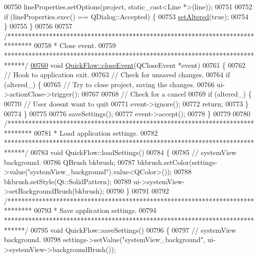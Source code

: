 \begin{DoxyCode}
00750   lineProperties.setOptions(project, static\_cast<Line *>(line));
00751 
00752   \textcolor{keywordflow}{if} (lineProperties.exec() == QDialog::Accepted) \{
00753     \hyperlink{group___window_ga4b63ea5ca52a9eea14db0a22b5a133f8}{setAltered}(\textcolor{keyword}{true});
00754   \}
00755 \}
00756 
00757 \textcolor{comment}{/*******************************************************************************}
00758 \textcolor{comment}{ * Close event.}
00759 \textcolor{comment}{ ******************************************************************************/}
\hypertarget{quickflow_8cpp_source_l00760}{}\hyperlink{group___window_gac8cc1bb329961a0781ffed7b6f2ab402}{00760} \textcolor{keywordtype}{void} \hyperlink{group___window_gac8cc1bb329961a0781ffed7b6f2ab402}{QuickFlow::closeEvent}(QCloseEvent *event)
00761 \{
00762   \textcolor{comment}{// Hook to application exit.}
00763   \textcolor{comment}{// Check for unsaved changes.}
00764   \textcolor{keywordflow}{if} (altered\_) \{
00765     \textcolor{comment}{// Try to close project, saving the changes.}
00766     ui->actionClose->trigger();
00767 
00768     \textcolor{comment}{// Check for a  cancel}
00769     \textcolor{keywordflow}{if} (altered\_) \{
00770       \textcolor{comment}{// User doesnt want to quit}
00771       \textcolor{keyword}{event}->ignore();
00772       \textcolor{keywordflow}{return};
00773     \}
00774   \}
00775 
00776   saveSettings();
00777   \textcolor{keyword}{event}->accept();
00778 \}
00779 
00780 \textcolor{comment}{/*******************************************************************************}
00781 \textcolor{comment}{ * Load application settings.}
00782 \textcolor{comment}{ ******************************************************************************/}
00783 \textcolor{keywordtype}{void} QuickFlow::loadSettings()
00784 \{
00785   \textcolor{comment}{// systemView background.}
00786   QBrush bkbrush;
00787   bkbrush.setColor(settings->value(\textcolor{stringliteral}{"systemView\_background"}).value<QColor>());
00788   bkbrush.setStyle(Qt::SolidPattern);
00789   ui->systemView->setBackgroundBrush(bkbrush);
00790 \}
00791 
00792 \textcolor{comment}{/*******************************************************************************}
00793 \textcolor{comment}{ * Save application settings.}
00794 \textcolor{comment}{ ******************************************************************************/}
00795 \textcolor{keywordtype}{void} QuickFlow::saveSettings()
00796 \{
00797   \textcolor{comment}{// systemView background.}
00798   settings->setValue(\textcolor{stringliteral}{"systemView\_background"}, ui->systemView->backgroundBrush());

\end{DoxyCode}
